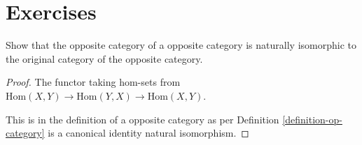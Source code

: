 \section{Exercises}

\begin{exercise}
    \label{exercise-opposite-opposite-category}
Show that the opposite category of a opposite category is naturally isomorphic to the original
category of the opposite category.
\end{exercise}

\begin{proof}
    The functor taking hom-sets from $\mathrm{Hom}(X,Y) \rightarrow \mathrm{Hom}(Y,X) \rightarrow \mathrm{Hom}(X,Y)$.

    This is in the definition of a opposite category as per Definition \ref{definition-op-category} is a canonical identity natural isomorphism.
\end{proof}